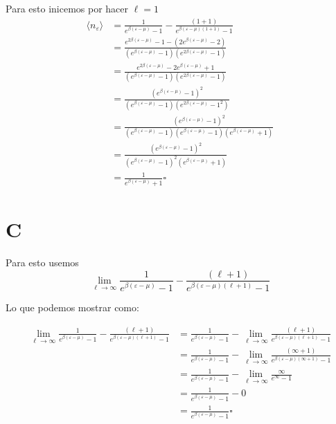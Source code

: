 \documentclass{report}
\begin{document}
Para esto inicemos por hacer $\ell = 1$
\begin{align*}
  \langle n_\varepsilon \rangle &= \frac{1}{e^{\beta(\varepsilon - \mu)} - 1} - \frac{(1 + 1)}{ e^{\beta (\varepsilon - \mu) (1 + 1)} - 1}\\
  &= \frac{e^{2\beta (\varepsilon - \mu)} - 1 - \left( 2e^{\beta(\varepsilon - \mu)} - 2\right)}{\left(e^{\beta(\varepsilon - \mu)} - 1\right) \left(e^{2\beta (\varepsilon - \mu)} - 1\right)}\\
  &= \frac{e^{2\beta (\varepsilon - \mu)} - 2e^{\beta(\varepsilon - \mu)} + 1}{\left(e^{\beta(\varepsilon - \mu)} - 1\right) \left(e^{2\beta (\varepsilon - \mu)} - 1\right)}\\
  &= \frac{\left(e^{\beta (\varepsilon - \mu)} - 1\right)^2}{\left(e^{\beta(\varepsilon - \mu)} - 1\right) \left(e^{2\beta (\varepsilon - \mu)} - 1^2\right)}\\
  &= \frac{\left(e^{\beta (\varepsilon - \mu)} - 1\right)^2}{\left(e^{\beta(\varepsilon - \mu)} - 1\right) \left(e^{\beta (\varepsilon - \mu)} - 1\right)\left(e^{\beta (\varepsilon - \mu)} + 1\right)}\\
  &= \frac{\left(e^{\beta (\varepsilon - \mu)} - 1\right)^2}{\left(e^{\beta(\varepsilon - \mu)} - 1\right)^2 \left(e^{\beta (\varepsilon - \mu)} + 1\right)}\\
  &= \frac{1}{e^{\beta (\varepsilon - \mu)} + 1}\square
\end{align*}

\section{C}

Para esto usemos
\[
  \lim_{\ell \to \infty} \frac{1}{e^{\beta(\varepsilon - \mu)} - 1} - \frac{(\ell + 1)}{ e^{\beta (\varepsilon - \mu) (\ell + 1)} - 1}
\]

Lo que podemos mostrar como:

\begin{align*}
  \lim_{\ell \to \infty} \frac{1}{e^{\beta(\varepsilon - \mu)} - 1} - \frac{(\ell + 1)}{ e^{\beta (\varepsilon - \mu) (\ell + 1)} - 1} &= \frac{1}{e^{\beta(\varepsilon - \mu)} - 1} - \lim_{\ell \to \infty}  \frac{(\ell + 1)}{ e^{\beta (\varepsilon - \mu) (\ell + 1)} - 1}\\
  &= \frac{1}{e^{\beta(\varepsilon - \mu)} - 1} - \lim_{\ell \to \infty}  \frac{(\infty + 1)}{ e^{\beta (\varepsilon - \mu) (\infty + 1)} - 1}\\
  &= \frac{1}{e^{\beta(\varepsilon - \mu)} - 1} - \lim_{\ell \to \infty}  \frac{\infty}{ e^{\infty} - 1}\\
  &= \frac{1}{e^{\beta(\varepsilon - \mu)} - 1} - 0 \\
  &= \frac{1}{e^{\beta(\varepsilon - \mu)} - 1}\square \\
\end{align*}
\end{document}
